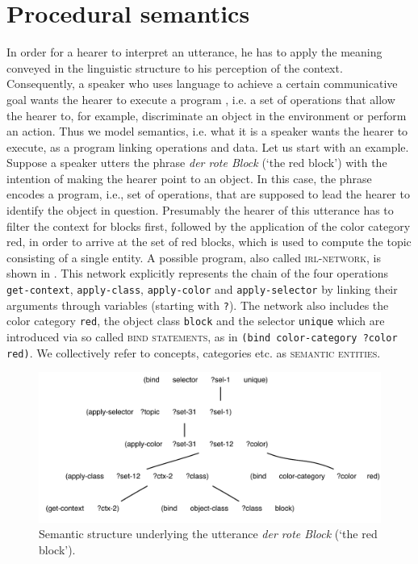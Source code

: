 \section{Procedural semantics}
\label{s:grounded-procedural-semantics}
In order for a hearer to interpret an utterance, he has to apply the 
meaning conveyed in the linguistic structure to his perception of 
the context. Consequently, a speaker who 
uses language to achieve a certain communicative goal wants 
the hearer to execute a program \citep{johnson1977procedural}, 
i.e. a set of operations that allow the hearer to, for example, discriminate 
an object in the environment or perform an action. Thus we model semantics, 
i.e. what it is a speaker wants the hearer to execute, as a 
program linking operations and data.  Let us start with an example. 
Suppose a speaker utters the phrase \textit{der rote Block} (`the red block') with the intention 
of making the hearer point to an object. In this case, the phrase 
encodes a program, i.e., set of operations, that are supposed to lead 
the hearer to identify the object in question. Presumably
the hearer of this utterance has to filter the context for blocks first, 
followed by the application of the color category
red, in order to arrive at the set of red blocks, which is used to 
compute the topic consisting of a single entity. A possible program, 
also called \textsc{irl-network}, is shown in .
This network explicitly represents the chain of the four operations {\footnotesize\tt get-context},
{\footnotesize\tt apply-class}, {\footnotesize\tt apply-color} and {\footnotesize\tt apply-selector}
by linking their arguments through variables 
(starting with {\footnotesize\tt ?}). The network also 
includes the color category {\footnotesize\tt red}, 
the object class {\footnotesize\tt block} and the selector 
{\footnotesize\tt unique} which are introduced via so called 
\textsc{bind statements}, as in 
{\footnotesize\tt (bind color-category ?color red)}. We collectively
refer to concepts, categories etc. as \textsc{semantic entities}.

\begin{figure}
	\center
	\includegraphics[width=.8\textwidth]{figs/the-red-block-network}
	\caption{Semantic structure underlying the utterance \textit{der rote Block} (`the red block').}
	\label{f:the-red-block-network}
\end{figure}

